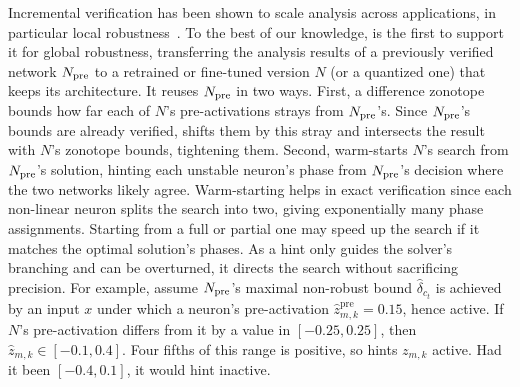 Incremental verification has been shown to scale analysis across applications, in particular local
robustness~\cite{ugare2023,ugare2022fanc,fischer2022,olive2025}. To the best of our knowledge, \tool is
the first to support it for global robustness, transferring the analysis results of a previously
verified network $N_{\mathrm{pre}}$ to a retrained or fine-tuned version $N$ (or a quantized one) that keeps its architecture. It reuses
$N_{\mathrm{pre}}$ in two ways. First, a difference zonotope bounds how far each of $N$'s pre-activations strays
from $N_{\mathrm{pre}}$'s. Since $N_{\mathrm{pre}}$'s bounds are already verified, \tool shifts them by this stray and
intersects the result with $N$'s zonotope bounds, tightening them. Second, \tool warm-starts $N$'s search from $N_{\mathrm{pre}}$'s solution, hinting each unstable neuron's phase
from $N_{\mathrm{pre}}$'s decision where the two networks likely agree. Warm-starting helps in exact verification
since each non-linear neuron splits the search into two, giving exponentially many phase assignments.
Starting from a full or partial one may speed up the search if it matches the optimal solution's phases. As a hint only guides
the solver's branching and can be overturned, it directs the search without sacrificing precision.
For example, assume $N_{\mathrm{pre}}$'s maximal non-robust bound $\hat{\delta}_{c_t}$ is achieved by an input $x$
under which a neuron's pre-activation $\hat{z}^{\mathrm{pre}}_{m,k} = 0.15$, hence active. If $N$'s pre-activation differs from it by a value in
$[-0.25,0.25]$, then $\hat{z}_{m,k} \in [-0.1,0.4]$. Four fifths of this range is positive, so \tool
hints $z_{m,k}$ active. Had it been $[-0.4,0.1]$, it would hint inactive.
